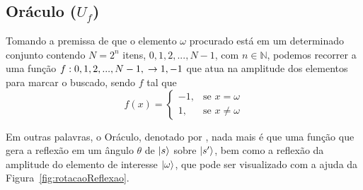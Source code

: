 \subsection{Or\'{a}culo ($U_f$)}
\label{subsec:oraculoAlg}

Tomando a premissa de que o elemento $\omega$ procurado está em um determinado conjunto contendo $N = 2^n$ itens, ${0, 1, 2, ..., N-1}$, com $n \in \mathbb{N}$, podemos recorrer a uma função $f : {0, 1, 2, ..., N-1},\\ \to {1,-1}$ que atua na amplitude dos elementos para marcar o buscado, sendo $f$ tal que
%
\begin{equation}
    f(x) = 
    \begin{cases}
        -1, & \text{se } x = \omega \\
        1, & \text{se } x \neq \omega
    \end{cases}
    \label{eq:fx Oraculo}
\end{equation}

Em outras palavras, o Oráculo, denotado por , nada mais é que uma função que gera a reflexão em um \^{a}ngulo $\theta$ de $\ket{s}$ sobre $\ket{s'}$, bem como a reflexão da amplitude do elemento de interesse $\ket{\omega}$, que pode ser visualizado com a ajuda da Figura~\ref{fig:rotacaoReflexao}.

